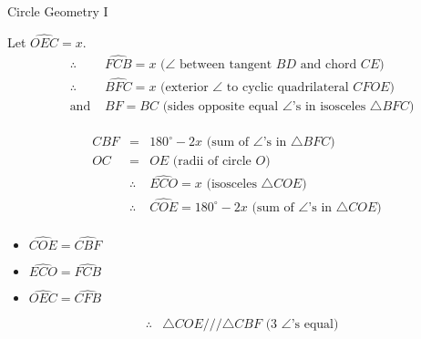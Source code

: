 \begin{wex}{%
Circle Geometry I}
{
Let $\hat{OEC} = x$.
\begin{eqnarray*}
&\therefore& \hat{FCB} = x \mbox{ ($\angle$ between tangent $BD$ and chord $CE$)}\\
&\therefore& \hat{BFC} = x \mbox{ (exterior $\angle$ to cyclic quadrilateral $CFOE$)}\\
&\mbox{and }& BF = BC \mbox{ (sides opposite equal $\angle$'s in isosceles $\triangle{BFC}$)}
\end{eqnarray*}

\begin{eqnarray*}
\hat{CBF} &=& 180^\circ - 2x \mbox{ (sum of $\angle$'s in $\triangle{BFC}$)}\\
OC &=& OE \mbox{ (radii of circle $O$)}\\
&\therefore& \hat{ECO} = x \mbox{ (isosceles $\triangle{COE}$)}\\
&\therefore& \hat{COE} = 180^\circ - 2x \mbox{ (sum of $\angle$'s in $\triangle{COE}$)}\\
\end{eqnarray*}
\begin{itemize}
\item $\hat{COE} = \hat{CBF}$
\item $\hat{ECO} = \hat{FCB}$
\item $\hat{OEC} = \hat{CFB}$
\end{itemize}
\begin{eqnarray*}
&\therefore& \triangle{COE} /// \triangle{CBF} \mbox{ (3 $\angle$'s equal)}\\
\end{eqnarray*}

}
\end{wex}
